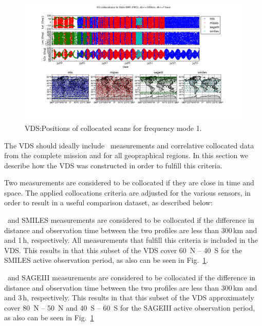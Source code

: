 \begin{figure}[t]
\centering
\includegraphics[width=17cm]{test_collocation_fm1.png}
\caption{VDS:Positions of collocated scans for frequency mode 1.}
\label{fig:vdsfm1}
\end{figure}


The VDS should ideally include \smr\ measurements and correlative collocated 
data from the complete mission and for all geopraphical regions.
In this section we describe how the VDS was constructed
in order to fulfill this criteria.


Two measurements are considered to be collocated if they
are close in time and space. The applied collocations
criteria are adjusted for the various sensors, in order
to result in a useful comparison dataset, as described below:

\smr\ and SMILES measurements are considered to be collocated if the 
difference in distance and observation time between the two profiles are 
less than 300\,km and and 1\,h, respectively. 
All measurements that fulfill this criteria is included
in the VDS. This results in that this subset of the VDS
cover 60\degree\ N -- 40\degree\ S for the SMILES
active observation period, as also can be seen in Fig.~\ref{fig:vdsfm1}.

\smr\ and SAGEIII measurements are considered to be collocated if the 
difference in distance and observation time between the two profiles are
less than 300\,km and and 3\,h, respectively.
This results in that this subset of the VDS
approximately cover 80\degree\ N -- 50\degree\ N and 40\degree\ S -- 60\degree\ S 
for the SAGEIII active observation period, as also can be seen in Fig.~\ref{fig:vdsfm1}

